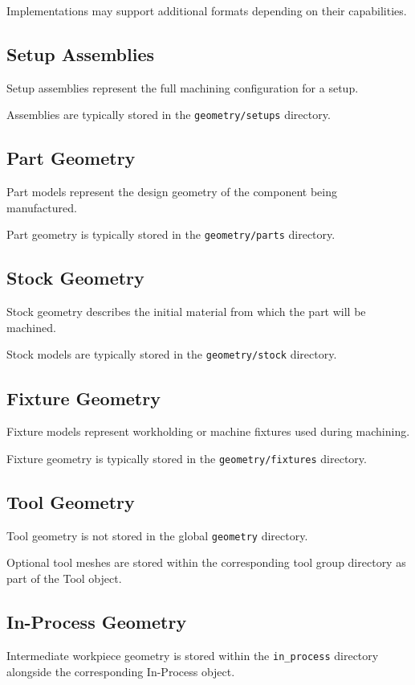 Implementations may support additional formats depending on their capabilities.

\subsection{Setup Assemblies}

Setup assemblies represent the full machining configuration for a setup.

Assemblies are typically stored in the \texttt{geometry/setups} directory.

\subsection{Part Geometry}

Part models represent the design geometry of the component being manufactured.

Part geometry is typically stored in the \texttt{geometry/parts} directory.

\subsection{Stock Geometry}

Stock geometry describes the initial material from which the part will be machined.

Stock models are typically stored in the \texttt{geometry/stock} directory.

\subsection{Fixture Geometry}

Fixture models represent workholding or machine fixtures used during machining.

Fixture geometry is typically stored in the \texttt{geometry/fixtures} directory.

\subsection{Tool Geometry}

Tool geometry is not stored in the global \texttt{geometry} directory.

Optional tool meshes are stored within the corresponding tool group directory as part of the Tool object.

\subsection{In-Process Geometry}

Intermediate workpiece geometry is stored within the \texttt{in\_process} directory alongside the corresponding In-Process object.
